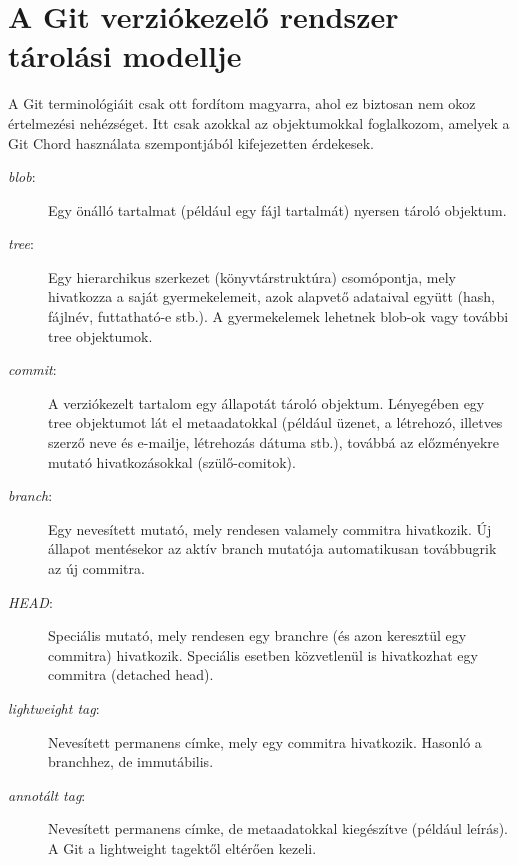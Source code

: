 \documentclass[
]{elteikthesis}[2025/03/25]
\begin{document}

\section{A Git verziókezelő rendszer tárolási modellje}


A Git terminológiáit csak ott fordítom magyarra,
ahol ez biztosan nem okoz értelmezési nehézséget.
Itt csak azokkal az objektumokkal foglalkozom,
amelyek a Git Chord használata szempontjából kifejezetten érdekesek.

\begin{description}
    \item[\textit{blob}:]
        Egy önálló tartalmat (például egy fájl tartalmát) nyersen tároló objektum.
    \item[\textit{tree}:] 
        Egy hierarchikus szerkezet (könyvtárstruktúra) csomópontja,
        mely hivatkozza a saját gyermekelemeit, azok alapvető adataival együtt
        (hash, fájlnév, futtatható-e stb.).
        A gyermekelemek lehetnek blob-ok vagy további tree objektumok.
    \item[\textit{commit}:]
        A verziókezelt tartalom egy állapotát tároló objektum.
        Lényegében egy tree objektumot lát el metaadatokkal
        (például üzenet, a létrehozó, illetves szerző neve és e-mailje, létrehozás dátuma stb.),
        továbbá az előzményekre mutató hivatkozásokkal (szülő-comitok).
    \item[\textit{branch}:]
        Egy nevesített mutató, mely rendesen valamely commitra hivatkozik.
        Új állapot mentésekor az aktív branch mutatója automatikusan továbbugrik az új commitra.
    \item[\textit{HEAD}:]
        Speciális mutató, mely rendesen egy branchre (és azon keresztül egy commitra) hivatkozik.
        Speciális esetben közvetlenül is hivatkozhat egy commitra (detached head).
    \item[\textit{lightweight tag}:]
        Nevesített permanens címke, mely egy commitra hivatkozik.
        Hasonló a branchhez, de immutábilis.
    \item[\textit{annotált tag}:]
        Nevesített permanens címke, de metaadatokkal kiegészítve (például leírás).
        A Git a lightweight tagektől eltérően kezeli.
\end{description}
\end{document}
